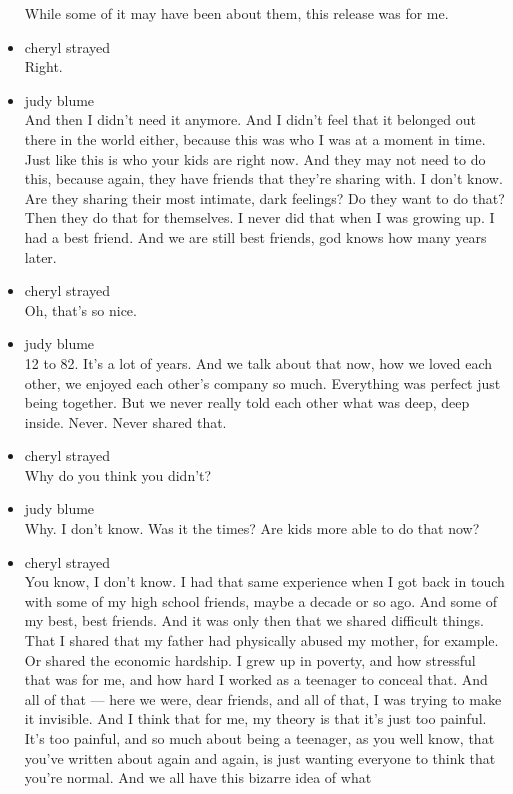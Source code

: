 \begin{itemize}
  While some of it may have been about them, this release was for me.
\item
  cheryl strayed\\
  Right.
\item
  judy blume\\
  And then I didn't need it anymore. And I didn't feel that it belonged
  out there in the world either, because this was who I was at a moment
  in time. Just like this is who your kids are right now. And they may
  not need to do this, because again, they have friends that they're
  sharing with. I don't know. Are they sharing their most intimate, dark
  feelings? Do they want to do that? Then they do that for themselves. I
  never did that when I was growing up. I had a best friend. And we are
  still best friends, god knows how many years later.
\item
  cheryl strayed\\
  Oh, that's so nice.
\item
  judy blume\\
  12 to 82. It's a lot of years. And we talk about that now, how we
  loved each other, we enjoyed each other's company so much. Everything
  was perfect just being together. But we never really told each other
  what was deep, deep inside. Never. Never shared that.
\item
  cheryl strayed\\
  Why do you think you didn't?
\item
  judy blume\\
  Why. I don't know. Was it the times? Are kids more able to do that
  now?
\item
  cheryl strayed\\
  You know, I don't know. I had that same experience when I got back in
  touch with some of my high school friends, maybe a decade or so ago.
  And some of my best, best friends. And it was only then that we shared
  difficult things. That I shared that my father had physically abused
  my mother, for example. Or shared the economic hardship. I grew up in
  poverty, and how stressful that was for me, and how hard I worked as a
  teenager to conceal that. And all of that --- here we were, dear
  friends, and all of that, I was trying to make it invisible. And I
  think that for me, my theory is that it's just too painful. It's too
  painful, and so much about being a teenager, as you well know, that
  you've written about again and again, is just wanting everyone to
  think that you're normal. And we all have this bizarre idea of what

\end{itemize}
